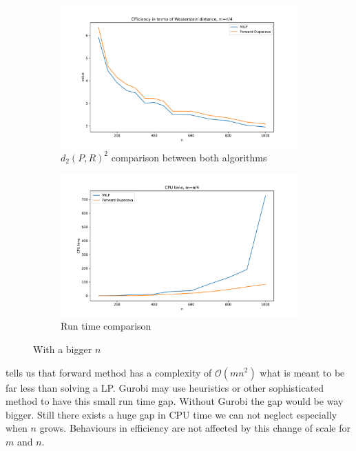 \documentclass{amsart}
\begin{document}
\begin{figure}[ht]
    \centering
    \begin{subfigure}[b]{0.45\textwidth}
        \centering
        \includegraphics[width=\textwidth]{plots/milp efficiency n4.pdf}
        \caption{$d_2\left(P,R\right)^2$ comparison between both algorithms}
        \label{n4 effi}
    \end{subfigure}
    \hfill
    \begin{subfigure}[b]{0.45\textwidth}
        \centering
        \includegraphics[width=\textwidth]{plots/run time comparison n4.pdf}
        \caption{Run time comparison}
        \label{n4 time}
    \end{subfigure}
    \caption{With a bigger $n$}
    \label{comparison n4}
\end{figure}

 tells us that forward method has a complexity of $\mathcal{O}\left(mn^2\right)$ what is meant to be far less than solving a LP. Gurobi may use heuristics or other sophisticated method to have this small run time gap. Without Gurobi the gap would be way bigger. Still there exists a huge gap in CPU time we can not neglect especially when $n$ grows. Behaviours in efficiency are not affected by this change of scale for $m$ and $n$.
\end{document}
